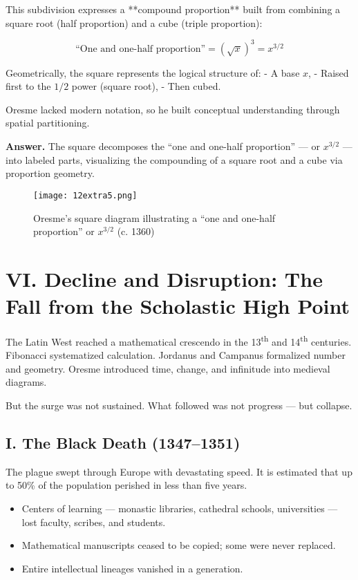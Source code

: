 \documentclass[9pt]{article}
\begin{document}
This subdivision expresses a **compound proportion** built from combining a square root (half proportion) and a cube (triple proportion):

\[
\text{“One and one-half proportion”} = \left(\sqrt{x}\right)^3 = x^{3/2}
\]

Geometrically, the square represents the logical structure of:
- A base \( x \),
- Raised first to the \( 1/2 \) power (square root),
- Then cubed.

Oresme lacked modern notation, so he built conceptual understanding through spatial partitioning.

\vspace{0.5em}

\textbf{Answer.} The square decomposes the “one and one-half proportion” — or \( x^{3/2} \) — into labeled parts, visualizing the compounding of a square root and a cube via proportion geometry.

\begin{figure}[H]
\centering
\texttt{[image: 12extra5.png]}
\caption{Oresme’s square diagram illustrating a “one and one-half proportion” or \( x^{3/2} \) (c. 1360)}
\end{figure}

\newpage

\section*{VI. Decline and Disruption: The Fall from the Scholastic High Point}

The Latin West reached a mathematical crescendo in the 13\textsuperscript{th} and 14\textsuperscript{th} centuries.  
Fibonacci systematized calculation.  
Jordanus and Campanus formalized number and geometry.  
Oresme introduced time, change, and infinitude into medieval diagrams.

But the surge was not sustained. What followed was not progress — but collapse.

\subsection*{I. The Black Death (1347–1351)}

The plague swept through Europe with devastating speed.  
It is estimated that up to 50\% of the population perished in less than five years.

\begin{itemize}
    \item Centers of learning — monastic libraries, cathedral schools, universities — lost faculty, scribes, and students.
    \item Mathematical manuscripts ceased to be copied; some were never replaced.
    \item Entire intellectual lineages vanished in a generation.
\end{itemize}
\end{document}
